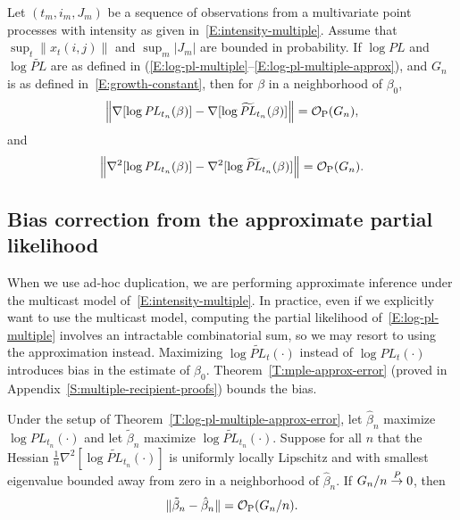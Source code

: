 \documentclass[final]{statsoc}
\begin{document}
\begin{theorem}\label{T:log-pl-multiple-approx-error}
    Let $(t_m, i_m, J_m)$ be a sequence of observations from a multivariate
    point processes with intensity as given in~\eqref{E:intensity-multiple}.
    Assume that
    \(
        \sup_t \| x_t (i,j) \|
    \)
    and
    \(
        \sup_m | J_m |
    \)
    are bounded in probability.
    If $\log \mathit{PL}$ and $\log \widetilde{\mathit{PL}}$ are as
    defined in
    \textnormal{(}\ref{E:log-pl-multiple}--\ref{E:log-pl-multiple-approx}\textnormal{)},
    and $G_n$ is as defined in~\eqref{E:growth-constant},
    then for $\beta$ in a neighborhood of $\beta_0$,
    \[
        \Big\|
        \nabla [\log \mathit{PL}_{t_n}(\beta) ]
        -
        \nabla [\log \widetilde{\mathit{PL}}_{t_n}(\beta) ]
        \Big\|
            =
            \mathcal{O}_\text{P}(G_n),
    \]
    and
    \[
        \Big\|
        \nabla^2 [\log \mathit{PL}_{t_n}(\beta) ]
        -
        \nabla^2 [\log \widetilde{\mathit{PL}}_{t_n}(\beta) ]
        \Big\|
            =
            \mathcal{O}_\text{P}(G_n).
    \]
\end{theorem}

\subsection{Bias correction from the approximate partial likelihood}
\label{S:approximation-bias}

When we use ad-hoc duplication, we are performing approximate inference
under the multicast model of~\eqref{E:intensity-multiple}.  In practice, even if we explicitly want to use the
multicast model, computing the partial likelihood of~\eqref{E:log-pl-multiple}
involves an intractable combinatorial sum, so we may resort to using the
approximation instead.  Maximizing $\log \widetilde{\mathit{PL}}_t(\cdot)$
instead of $\log \mathit{PL}_t(\cdot)$ introduces bias in the estimate of
$\beta_0$.  Theorem~\ref{T:mple-approx-error} (proved in Appendix~\ref{S:multiple-recipient-proofs}) bounds the bias.

\begin{theorem}\label{T:mple-approx-error}
    Under the setup of Theorem~\ref{T:log-pl-multiple-approx-error},
    let $\hat \beta_n$ maximize $\log \mathit{PL}_{t_n}(\cdot)$
    and let $\tilde \beta_n$ maximize
    $\log \widetilde{\mathit{PL}}_{t_n}(\cdot)$.
    Suppose for all $n$ that the Hessian
    \(
        \tfrac{1}{n}
        \nabla^2
        [ \log \mathit{\widetilde{PL}}_{t_n}(\cdot)]
    \)
    is uniformly locally Lipschitz and with smallest eigenvalue bounded away from zero
    in a neighborhood of $\hat \beta_n$.
    If $G_n/n \overset{\mathit{P}}{\to} 0$, then
    \[
        \| \tilde \beta_{n} - \hat \beta_{n} \|
            =
            \mathcal{O}_\text{P}(G_n/n).
    \]
\end{theorem}
\end{document}
